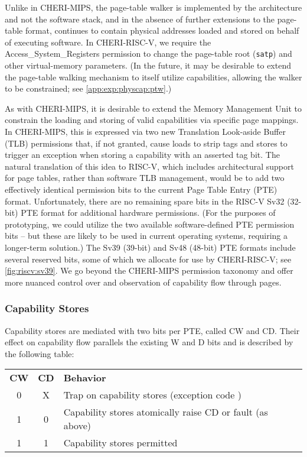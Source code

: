 Unlike in CHERI-MIPS, the page-table walker is implemented by the architecture
and not the software stack, and in the absence of further extensions to the
page-table format, continues to contain physical addresses loaded and stored
on behalf of executing software.
In CHERI-RISC-V, we require the Access\_System\_Registers permission to change
the page-table root (\texttt{satp}) and other virtual-memory parameters.
(In the future, it may be desirable to extend the page-table walking mechanism
to itself utilize capabilities, allowing the walker to be constrained;
see \cref{app:exp:physcap:ptw}.)

As with CHERI-MIPS, it is desirable to extend the Memory Management Unit
to constrain the loading and storing of valid capabilities via specific page
mappings.
In CHERI-MIPS, this is expressed via two new Translation Look-aside Buffer
(TLB) permissions that, if not granted, cause loads to strip tags and stores to
trigger an exception when storing a capability with an asserted tag bit.
%
The natural translation of this idea to RISC-V, which includes architectural
support for page tables, rather than software TLB management, would be to add
two effectively identical permission bits to the current Page Table Entry
(PTE) format.
%
Unfortunately, there are no remaining spare bits in the RISC-V Sv32 (32-bit)
PTE format for additional hardware permissions.
(For the purposes of prototyping, we could utilize the two
available software-defined PTE permission bits -- but these are likely to be
used in current operating systems, requiring a longer-term solution.)
%
The Sv39 (39-bit) and Sv48 (48-bit) PTE formats include several reserved bits,
some of which we allocate for use by CHERI-RISC-V; see \cref{fig:riscv:sv39}.
%
We go beyond the CHERI-MIPS permission taxonomy and offer more nuanced control
over and observation of capability flow through pages.

\subsubsection{Capability Stores}

Capability stores are mediated with two bits per PTE, called CW and CD.  Their
effect on capability flow parallels the existing W and D bits and is described
by the following table:

\begin{center}
%
\begin{tabular}{ccl}

\textbf{CW} & \textbf{CD} & \textbf{Behavior} \\
0 & X & Trap on capability stores (exception code \riscvstorecappagefault{}) \\
1 & 0 & Capability stores atomically raise CD or fault (as above) \\
1 & 1 & Capability stores permitted
\end{tabular}
%
\end{center}

